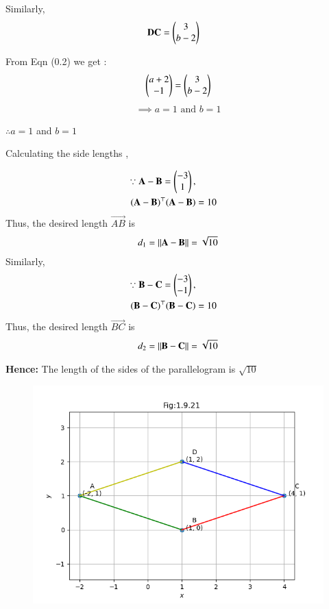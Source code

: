 \documentclass[journal]{IEEEtran}
\numberwithin{equation}{enumi}
\numberwithin{figure}{enumi}
\begin{document}
Similarly, 
\begin{align}
    \mathbf{DC} &= \begin{pmatrix}3\\b-2\end{pmatrix}
\end{align}

From Eqn (0.2) we get : 
\begin{align}
    \begin{pmatrix}a+2\\-1\end{pmatrix} = \begin{pmatrix}3\\b-2\end{pmatrix} \\
\end{align}
\begin{align}
    \implies a = 1 \text{ and }  b = 1
 \end{align}

$\therefore a = 1$ and $ b = 1 $ 

Calculating the side lengths , 

\begin{align}
    \because \mathbf{A} - \mathbf{B} = \begin{pmatrix}-3\\1\end{pmatrix} , \\
    (\mathbf{A} - \mathbf{B})^\top (\mathbf{A} - \mathbf{B}) &=  10
\end{align}
Thus, the desired length $\vec{AB}$ is 
\begin{align}
		d_1=\left\lVert\mathbf{A}-\mathbf{B}\right\rVert =\sqrt{10}
\end{align}
Similarly, 
\begin{align}
    \because \mathbf{B} - \mathbf{C} = \begin{pmatrix}-3\\-1\end{pmatrix} , \\
    (\mathbf{B} - \mathbf{C})^\top (\mathbf{B} - \mathbf{C}) &=  10
\end{align}
Thus, the desired length $\vec{BC}$ is 
\begin{align}
		d_2=\left\lVert\mathbf{B}-\mathbf{C}\right\rVert =\sqrt{10}
\end{align}

\textbf{Hence: } The length of the sides of the parallelogram is $ \sqrt{10} $

\begin{figure}[H]
    \centering
    \includegraphics[width=1.0\columnwidth]{figs/p_gram1.png}
    \caption*{}
    \label{fig:}
\end{figure}
\end{document}
